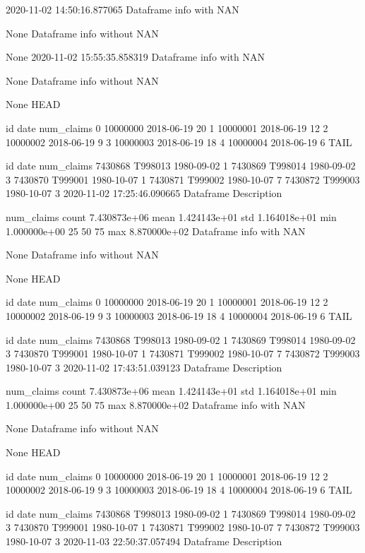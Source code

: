2020-11-02 14:50:16.877065
Dataframe info with NAN 

None
Dataframe info without NAN 

None
2020-11-02 15:55:35.858319
Dataframe info with NAN 

None
Dataframe info without NAN 

None
HEAD 

         id        date  num_claims
0  10000000  2018-06-19          20
1  10000001  2018-06-19          12
2  10000002  2018-06-19           9
3  10000003  2018-06-19          18
4  10000004  2018-06-19           6
TAIL 

              id        date  num_claims
7430868  T998013  1980-09-02           1
7430869  T998014  1980-09-02           3
7430870  T999001  1980-10-07           1
7430871  T999002  1980-10-07           7
7430872  T999003  1980-10-07           3
2020-11-02 17:25:46.090665
Dataframe Description 

         num_claims
count  7.430873e+06
mean   1.424143e+01
std    1.164018e+01
min    1.000000e+00
25%
50%
75%
max    8.870000e+02
Dataframe info with NAN 

None
Dataframe info without NAN 

None
HEAD 

         id        date  num_claims
0  10000000  2018-06-19          20
1  10000001  2018-06-19          12
2  10000002  2018-06-19           9
3  10000003  2018-06-19          18
4  10000004  2018-06-19           6
TAIL 

              id        date  num_claims
7430868  T998013  1980-09-02           1
7430869  T998014  1980-09-02           3
7430870  T999001  1980-10-07           1
7430871  T999002  1980-10-07           7
7430872  T999003  1980-10-07           3
2020-11-02 17:43:51.039123
Dataframe Description 

         num_claims
count  7.430873e+06
mean   1.424143e+01
std    1.164018e+01
min    1.000000e+00
25%
50%
75%
max    8.870000e+02
Dataframe info with NAN 

None
Dataframe info without NAN 

None
HEAD 

         id        date  num_claims
0  10000000  2018-06-19          20
1  10000001  2018-06-19          12
2  10000002  2018-06-19           9
3  10000003  2018-06-19          18
4  10000004  2018-06-19           6
TAIL 

              id        date  num_claims
7430868  T998013  1980-09-02           1
7430869  T998014  1980-09-02           3
7430870  T999001  1980-10-07           1
7430871  T999002  1980-10-07           7
7430872  T999003  1980-10-07           3
2020-11-03 22:50:37.057494
Dataframe Description 

